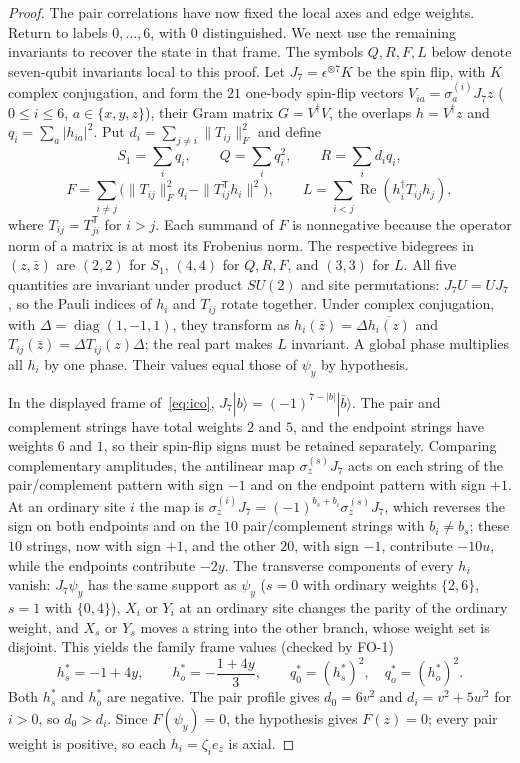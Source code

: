 \begin{proof}
The pair correlations have now fixed the local axes and edge weights. Return to labels $0,\ldots,6$,
with $0$ distinguished. We next use the remaining invariants to recover the state in that frame.
The symbols $Q,R,F,L$ below denote seven-qubit invariants local to this proof. Let
$J_7=\epsilon^{\otimes7}K$ be the spin flip, with $K$ complex conjugation,
and form the $21$ one-body spin-flip vectors $V_{ia}=\sigma_a^{(i)}J_7z$
($0\le i\le6$, $a\in\{x,y,z\}$), their Gram matrix $G=V^\dagger V$,
the overlaps $h=V^\dagger z$ and $q_i=\sum_a|h_{ia}|^2$.
Put $d_i=\sum_{j\ne i}\|T_{ij}\|_F^2$ and define
\[
 S_1=\sum_iq_i,\qquad Q=\sum_iq_i^2,\qquad
 R=\sum_id_iq_i,
\]
\[
 F=\sum_{i\ne j}\bigl(\|T_{ij}\|_F^2q_i
                -\|T_{ij}^{\mathsf T}h_i\|^2\bigr),\qquad
 L=\sum_{i<j}\operatorname{Re}(h_i^\dagger T_{ij}h_j),
\]
where $T_{ij}=T_{ji}^{\mathsf T}$ for $i>j$.
Each summand of $F$ is nonnegative because the operator norm of a
matrix is at most its Frobenius norm.  The respective bidegrees in
$(z,\bar z)$ are $(2,2)$ for $S_1$, $(4,4)$ for $Q,R,F$, and $(3,3)$
for $L$.  All five quantities are invariant under product $SU(2)$
and site permutations: $J_7U=UJ_7$, so the Pauli indices of $h_i$
and $T_{ij}$ rotate together.  Under complex conjugation, with
$\Delta=\operatorname{diag}(1,-1,1)$, they transform as
$h_i(\bar z)=\Delta\overline{h_i(z)}$ and
$T_{ij}(\bar z)=\Delta T_{ij}(z)\Delta$; the real part makes $L$ invariant.
A global phase multiplies all $h_i$ by one phase.  Their values equal those of $\psi_y$ by hypothesis.

In the displayed frame of~\eqref{eq:ico}, $J_7|b\rangle=(-1)^{7-|b|}|\bar b\rangle$. The pair and complement strings have total weights $2$ and $5$, and the endpoint strings have weights $6$ and $1$, so their spin-flip signs must be retained separately. Comparing complementary amplitudes, the antilinear map $\sigma_z^{(s)}J_7$ acts on each string of the pair/complement pattern with sign $-1$ and on the endpoint pattern with sign $+1$. At an ordinary site $i$ the map is $\sigma_z^{(i)}J_7=(-1)^{b_s+b_i}\sigma_z^{(s)}J_7$, which reverses the sign on both endpoints and on the $10$ pair/complement strings with $b_i\ne b_s$; these $10$ strings, now with sign $+1$, and the other $20$, with sign $-1$, contribute $-10u$, while the endpoints contribute $-2y$. The transverse components of every $h_i$ vanish: $J_7\psi_y$ has the same support as $\psi_y$ ($s=0$ with ordinary weights $\{2,6\}$, $s=1$ with $\{0,4\}$), $X_i$ or $Y_i$ at an ordinary site changes the parity of the ordinary weight, and $X_s$ or $Y_s$ moves a string into the other branch, whose weight set is disjoint. This yields the family frame values (checked by FO-1)
\[
 h_s^*=-1+4y,\qquad h_o^*=-\frac{1+4y}{3},\qquad
 q_0^*=(h_s^*)^2,\quad q_o^*=(h_o^*)^2.
\]
Both $h_s^*$ and $h_o^*$ are negative. The pair profile gives
$d_0=6v^2$ and $d_i=v^2+5w^2$ for $i>0$, so $d_0>d_i$.
Since $F(\psi_y)=0$, the hypothesis gives $F(z)=0$; every pair weight
is positive, so each $h_i=\zeta_i e_z$ is axial.


\end{proof}

